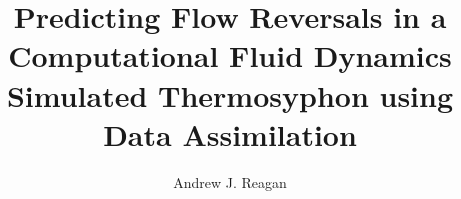 \title{Predicting Flow Reversals in a Computational Fluid Dynamics Simulated Thermosyphon using Data Assimilation}
\author{Andrew J. Reagan}
\thesis                             %
\masterscience                      %
\apma                                 %
\jangrad                            %
\def\gradyear{2014}

